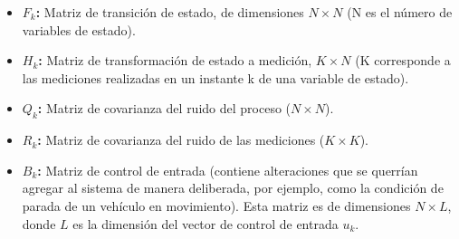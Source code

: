 \begin{itemize}
\item \textbf{$F_k$:} Matriz de transici\'on de estado, de dimensiones $N\times N$ (N es el n\'umero de variables de estado).
\item \textbf{$H_k$:} Matriz de transformaci\'on de estado a medici\'on, $K\times N$ (K corresponde a las mediciones realizadas en un instante k de una variable de estado).
\item \textbf{$Q_k$:} Matriz de covarianza del ruido del proceso ($N\times N$).
\item \textbf{$R_k$:} Matriz de covarianza del ruido de las mediciones ($K\times K$).
\item \textbf{$B_k$:} Matriz de control de entrada (contiene alteraciones que se querr\'ian agregar al sistema de manera deliberada, por ejemplo, como la condici\'on de parada de un veh\'iculo en movimiento). Esta matriz es de dimensiones $N\times L$, donde $L$ es la dimensi\'on del vector de control de entrada $u_k$.
\end{itemize}
\bigskip



